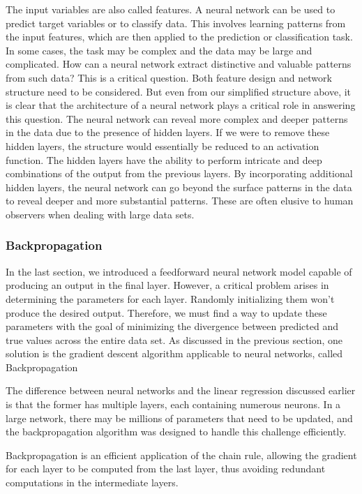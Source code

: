 \documentclass{article}
\begin{document}
The input variables are also called features. A neural network can be used to predict target variables or to classify data. This involves learning patterns from the input features, which are then applied to the prediction or classification task. In some cases, the task may be complex and the data may be large and complicated. How can a neural network extract distinctive and valuable patterns from such data? This is a critical question. Both feature design and network structure need to be considered. But even from our simplified structure above, it is clear that the architecture of a neural network plays a critical role in answering this question. The neural network can reveal more complex and deeper patterns in the data due to the presence of hidden layers. If we were to remove these hidden layers, the structure would essentially be reduced to an activation function. The hidden layers have the ability to perform intricate and deep combinations of the output from the previous layers. By incorporating additional hidden layers, the neural network can go beyond the surface patterns in the data to reveal deeper and more substantial patterns. These are often elusive to human observers when dealing with large data sets.



\newpage
	\subsubsection{Backpropagation}

    In the last section, we introduced a feedforward neural network model capable of producing an output in the final layer. However, a critical problem arises in determining the parameters for each layer. Randomly initializing them won't produce the desired output. Therefore, we must find a way to update these parameters with the goal of minimizing the divergence between predicted and true values across the entire data set. As discussed in the previous section, one solution is the gradient descent algorithm applicable to neural networks, called Backpropagation

    The difference between neural networks and the linear regression discussed earlier is that the former has multiple layers, each containing numerous neurons. In a large network, there may be millions of parameters that need to be updated, and the backpropagation algorithm was designed to handle this challenge efficiently.

    Backpropagation is an efficient application of the chain rule, allowing the gradient for each layer to be computed from the last layer, thus avoiding redundant computations in the intermediate layers.\\
\end{document}
